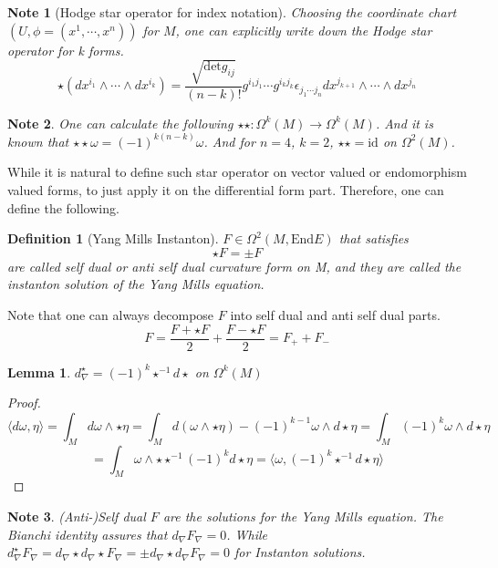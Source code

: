 \documentclass{article}
\newtheorem{defn}{Definition}
\newtheorem{lem}{Lemma}
\newtheorem{note}{Note}
\begin{document}
\begin{note}[Hodge star operator for index notation]
    Choosing the coordinate chart $(U,\phi = (x^1,\cdots ,x^n))$ for $M$, one can explicitly write down the Hodge star operator for k forms.
    \[
        \star (dx^{i_1}\wedge \cdots \wedge dx^{i_k}) = \frac{\sqrt{\mathrm{det}g_{ij}}}{(n-k)!} g^{i_1 j_1}\cdots g^{i_k j_k} \epsilon_{j_1\cdots j_n} dx^{j_{k+1}}\wedge\cdots\wedge dx^{j_n}
    \]
\end{note}
\begin{note}
    One can calculate the following $\star\star:\Omega^k(M)\rightarrow\Omega^k(M)$.
    And it is known that $\star\star\omega = (-1)^{k(n-k)}\omega$. And for $n=4$, $k=2$, $\star\star = \mathrm{id}$  on $\Omega^2(M)$.
\end{note}
While it is natural to define such star operator on vector valued or endomorphism valued forms, to just apply it on the differential form part. Therefore, one can define the following.
\begin{defn}[Yang Mills Instanton]
    $F\in\Omega^2(M,\mathrm{End}E)$ that satisfies
    \[
        \star F = \pm F
    \]
    are called self dual or anti self dual curvature form on M, and they are called the instanton solution of the Yang Mills equation. 
\end{defn}

Note that one can  always decompose $F$ into self dual and anti self dual parts.
\[
    F  = \frac{ F + \star F}{2} + \frac{ F - \star F}{2} = F_+ + F_-
\]

\begin{lem}
    $d_\nabla^\star = (-1)^k \star^{-1} d\star $ on $\Omega^k(M)$
\end{lem}
\begin{proof}
   \[
        \langle d\omega,\eta \rangle = \int_M d\omega \wedge \star \eta = \int_M d(\omega\wedge\star\eta) - (-1)^{k-1}\omega \wedge d\star\eta = \int_M (-1)^k \omega \wedge d\star \eta
     \]   
    \[= \int_M \omega\wedge \star \star^{-1} (-1)^k d\star\eta = \langle\omega,(-1)^k\star^{-1}d\star \eta\rangle
   \]
   
\end{proof}

\begin{note}
    (Anti-)Self dual $F$ are the solutions for the Yang Mills equation. The Bianchi identity assures that $d_\nabla F_\nabla =0$. While $d_\nabla^\star F_\nabla = d_\nabla \star d_\nabla \star F_\nabla = \pm d_\nabla \star d_\nabla F_\nabla = 0$ for Instanton solutions. 
\end{note}
\end{document}
